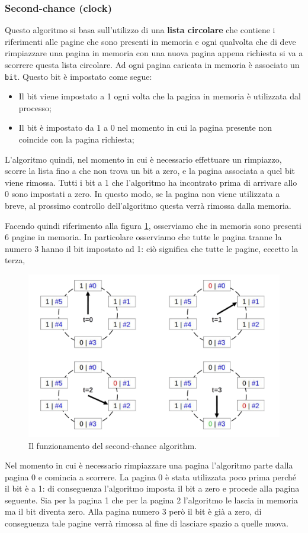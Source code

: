 \subsubsection{Second-chance (clock)}\label{second chance}
Questo algoritmo si basa sull'utilizzo di una \textbf{lista circolare} che contiene i riferimenti alle pagine che sono presenti in memoria e ogni qualvolta che di deve rimpiazzare una pagina in memoria con una nuova pagina appena richiesta si va a scorrere questa lista circolare. Ad ogni pagina caricata in memoria è associato un \texttt{bit}. Questo bit è impostato come segue:
\vspace{-4px}
\begin{itemize}
\setlength{\itemsep}{-1px}
    \item Il bit viene impostato a 1 ogni volta che la pagina in memoria è utilizzata dal processo;
    \item Il bit è impostato da 1 a 0 nel momento in cui la pagina presente non coincide con la pagina richiesta;
\end{itemize}
L'algoritmo quindi, nel momento in cui è necessario effettuare un rimpiazzo, scorre la lista fino a che non trova un bit a zero, e la pagina associata a quel bit viene rimossa. Tutti i bit a 1 che l'algoritmo ha incontrato prima di arrivare allo 0 sono impostati a zero. In questo modo, se la pagina non viene utilizzata a breve, al prossimo controllo dell'algoritmo questa verrà rimossa dalla memoria.

Facendo quindi riferimento alla figura \ref{fig:second_chance}, osserviamo che in memoria sono presenti 6 pagine in memoria. In particolare osserviamo che tutte le pagina tranne la numero 3 hanno il bit impostato ad 1: ciò significa che tutte le pagine, eccetto la terza, 
\begin{figure}[h]
    \centering
    \includegraphics[width = .6\textwidth]{../res/imgs/virtual memory/second_chance.png}
    \caption{Il funzionamento del second-chance algorithm.}
    \label{fig:second_chance}
\end{figure}
Nel momento in cui è necessario rimpiazzare una pagina l'algoritmo parte dalla pagina 0 e comincia a scorrere. La pagina 0 è stata utilizzata poco prima perché il bit è a 1: di conseguenza l'algoritmo imposta il bit a zero e procede alla pagina seguente. Sia per la pagina 1 che per la pagina 2 l'algoritmo le lascia in memoria ma il bit diventa zero. Alla pagina numero 3 però il bit è già a zero, di conseguenza tale pagine verrà rimossa al fine di lasciare spazio a quelle nuova. 


